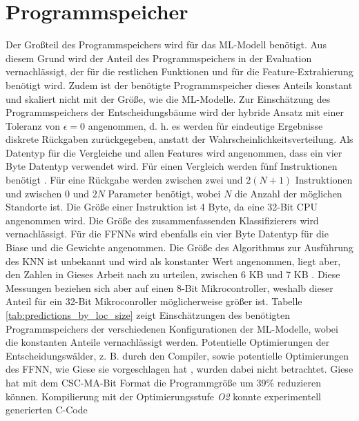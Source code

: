 \section{Programmspeicher}
Der Großteil des Programmspeichers wird für das ML-Modell benötigt.
Aus diesem Grund wird der Anteil des Programmspeichers in der Evaluation vernachlässigt,
der für die restlichen Funktionen und für die Feature-Extrahierung benötigt wird.
Zudem ist der benötigte Programmspeicher dieses Anteils konstant und skaliert nicht mit der Größe, wie die ML-Modelle.
\newline
\newline
Zur Einschätzung des Programmspeichers der Entscheidungsbäume wird der hybride Ansatz mit einer Toleranz von $\epsilon=0$ angenommen,
d. h. es werden für eindeutige Ergebnisse diskrete Rückgaben zurückgegeben, anstatt der Wahrscheinlichkeitsverteilung.
Als Datentyp für die Vergleiche und allen Features wird angenommen, dass ein vier Byte Datentyp verwendet wird.
Für einen Vergleich werden fünf Instruktionen benötigt \cite{dymelThesis}.
Für eine Rückgabe werden zwischen zwei und $2(N+1)$ Instruktionen und zwischen 0 und $2N$ Parameter benötigt,
wobei $N$ die Anzahl der möglichen Standorte ist.
Die Größe einer Instruktion ist 4 Byte, da eine 32-Bit CPU angenommen wird.
Die Größe des zusammenfassenden Klassifizierers wird vernachlässigt.
\newline
\newline
Für die FFNNs wird ebenfalls ein vier Byte Datentyp für die Biase und die Gewichte angenommen.
Die Größe des Algorithmus zur Ausführung des KNN ist unbekannt und wird als konstanter Wert angenommen,
liegt aber, den Zahlen in Gieses Arbeit nach zu urteilen, zwischen 6 KB und 7 KB \cite{gieseThesis}.
Diese Messungen beziehen sich aber auf einen 8-Bit Mikrocontroller, weshalb dieser Anteil für ein 32-Bit Mikroconroller möglicherweise größer ist.
\newline
\newline
Tabelle \ref{tab:predictions_by_loc_size} zeigt Einschätzungen des benötigten Programmspeichers der verschiedenen Konfigurationen der ML-Modelle,
wobei die konstanten Anteile vernachlässigt werden.
Potentielle Optimierungen der Entscheidungswälder, z. B. durch den Compiler,
sowie potentielle Optimierungen des FFNN, wie Giese sie vorgeschlagen hat \cite{gieseThesis}, wurden dabei nicht betrachtet.
Giese hat mit dem CSC-MA-Bit Format die Programmgröße um 39\% reduzieren können.
Kompilierung mit der Optimierungsstufe \textit{O2} konnte experimentell generierten C-Code
